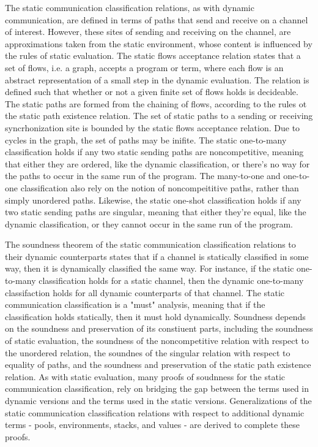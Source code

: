 \documentclass[letterpaper, 11pt]{report}
\begin{document}
The static communication classification relations, as with dynamic communication, are defined in terms of paths
that send and receive on a channel of interest. However, these sites of sending and receiving on the channel, are approximations
taken from the static environment, whose content is influenced by the rules of static evaluation.
The static flows acceptance relation states that a set of flows, i.e. a graph, accepts a program or term, where each flow is
an abstract representation of a small step in the dynamic evaluation. The relation is defined such that
whether or not a given finite set of flows holds is decideable. The static paths are formed from the chaining of flows, according
to the rules ot the static path existence relation.
The set of static paths to a sending or receiving syncrhonization site is bounded by the static flows acceptance
relation. Due to cycles in the graph, the set of paths may be inifite. 
The static one-to-many classification holds if any two static sending paths are noncompetitive, meaning
that either they are ordered, like the dynamic classification, or there's no way for the paths to occur in the same run
of the program. The many-to-one and one-to-one classification also rely on the notion of noncompeititive paths, rather than
simply unordered paths. Likewise, the static one-shot classification holds if any two static sending paths are singular,
meaning that either they're equal, like the dynamic classification, or they cannot occur in the same run of the program.

The soundness theorem of the static communication classification relations to their dynamic counterparts states that if
a channel is statically classified in some way, then it is dynamically classified the same way. For instance, if the
static one-to-many classification holds for a static channel, then the dynamic one-to-many classifaction holds for
all dynamic counterparts of that channel. The static communication classification is a "must" analysis, meaning that
if the classification holds statically, then it must hold dynamically. Soundness depends on the soundness and preservation
of its constiuent parts,
including the soundness of static evaluation, the soundness of the noncompetitive relation with respect to
the unordered relation, the soundnes of the singular relation with respect to equality of paths,
and the soundness and preservation of the static path existence relation. As with static evaluation, many proofs of
soudnness for the static communication classification, rely on bridging the gap between the terms used in dynamic
versions and the terms used in the static versions. Generalizations of the static communication classification relations
with respect to additional dynamic terms - pools, environments, stacks, and values - are derived to complete these proofs.
\end{document}
